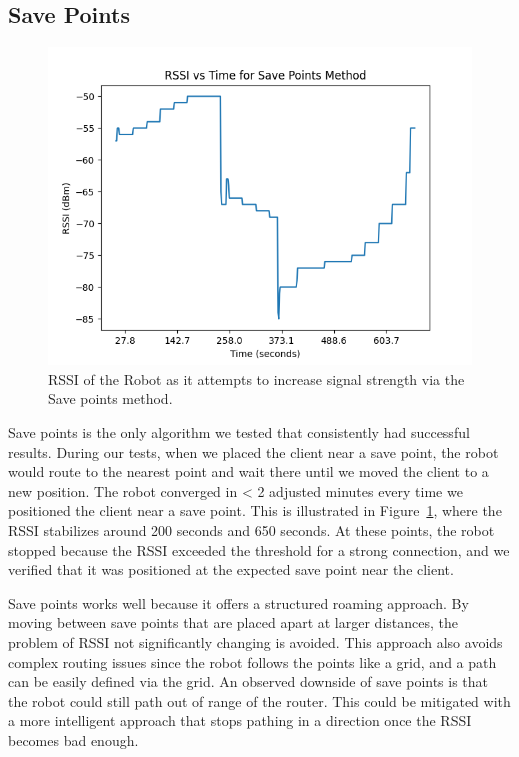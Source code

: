 \subsection{Save Points}
\begin{figure}[tp]
\centering
\includegraphics[scale=0.5]{figures/rssi_save_points}
\caption{RSSI of the Robot as it attempts to increase signal strength via the Save points method.}
\label{fig:rssi_save_points}
\end{figure}
Save points is the only algorithm we tested that consistently had successful results. During our tests, when we placed the client near a save point, the robot would route to the nearest point and wait there until we moved the client to a new position.  The robot converged in < 2 adjusted minutes every time we positioned the client near a save point. This is illustrated in Figure~\ref{fig:rssi_save_points}, where the RSSI stabilizes around 200 seconds and 650 seconds. At these points, the robot stopped because the RSSI exceeded the threshold for a strong connection, and we verified that it was positioned at the expected save point near the client.

Save points works well because it offers a structured roaming approach. By moving between save points that are placed apart at larger distances, the problem of RSSI not significantly changing is avoided. This approach also avoids complex routing issues since the robot follows the points like a grid, and a path can be easily defined via the grid. An observed downside of save points is that the robot could still path out of range of the router. This could be mitigated with a more intelligent approach that stops pathing in a direction once the RSSI becomes bad enough.

